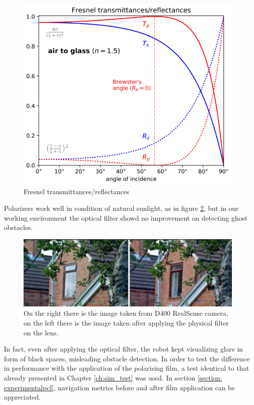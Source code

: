 \begin{figure}[H]
    \centering
    \includegraphics[scale=0.5]{Images/Chapter 6/glare.png}
    \caption{Fresnel transmittances/reflectances}
    \label{fig:my_label}
\end{figure}
Polarizers work well in condition of natural sunlight, as in figure \ref{fig:reflective_glass}, but in our working environment the optical filter showd no improvement on detecting ghost obstacles.

\begin{figure}[H]
    \centering
    \includegraphics[scale = 0.5]{Images/Chapter 6/reflective_surface.png}
    \caption{On the right there is the image taken from D400 RealSense camera, on the left there is the image taken after applying the physical filter on the lens.}
    \label{fig:reflective_glass}
\end{figure}
In fact, even after applying the optical filter, the robot kept visualizing glare in form of black spaces, misleading obstacle detection.
In order to test the difference in performance with the application of the polarising film, a test identical to that already presented in Chapter \ref{ch:sim_test} was used.
In section \ref{section: experimentalpcl}, navigation metrics before and after film application can be appreciated.


